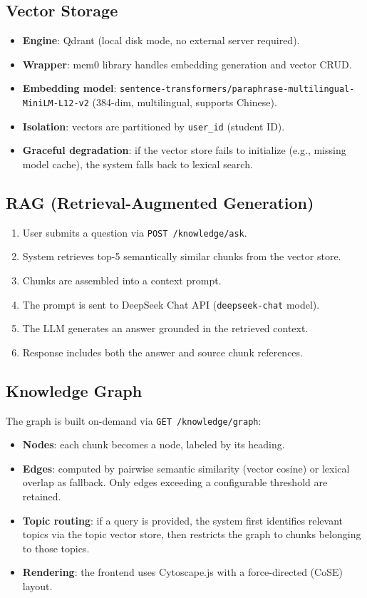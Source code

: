 \documentclass[12pt,a4paper]{article}
\begin{document}
\subsection{Vector Storage}

\begin{itemize}[nosep]
    \item \textbf{Engine}: Qdrant (local disk mode, no external server required).
    \item \textbf{Wrapper}: mem0 library handles embedding generation and vector CRUD.
    \item \textbf{Embedding model}: \texttt{sentence-transformers/paraphrase-multilingual-MiniLM-L12-v2} (384-dim, multilingual, supports Chinese).
    \item \textbf{Isolation}: vectors are partitioned by \texttt{user\_id} (student ID).
    \item \textbf{Graceful degradation}: if the vector store fails to initialize (e.g., missing model cache), the system falls back to lexical search.
\end{itemize}

\subsection{RAG (Retrieval-Augmented Generation)}

\begin{enumerate}[nosep]
    \item User submits a question via \texttt{POST /knowledge/ask}.
    \item System retrieves top-5 semantically similar chunks from the vector store.
    \item Chunks are assembled into a context prompt.
    \item The prompt is sent to DeepSeek Chat API (\texttt{deepseek-chat} model).
    \item The LLM generates an answer grounded in the retrieved context.
    \item Response includes both the answer and source chunk references.
\end{enumerate}

\subsection{Knowledge Graph}

The graph is built on-demand via \texttt{GET /knowledge/graph}:
\begin{itemize}[nosep]
    \item \textbf{Nodes}: each chunk becomes a node, labeled by its heading.
    \item \textbf{Edges}: computed by pairwise semantic similarity (vector cosine) or lexical overlap as fallback. Only edges exceeding a configurable threshold are retained.
    \item \textbf{Topic routing}: if a query is provided, the system first identifies relevant topics via the topic vector store, then restricts the graph to chunks belonging to those topics.
    \item \textbf{Rendering}: the frontend uses Cytoscape.js with a force-directed (CoSE) layout.
\end{itemize}
\end{document}
